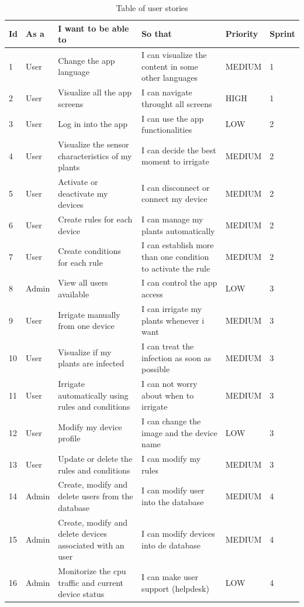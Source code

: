 \documentclass[11pt,a4paper]{article}
\begin{document}
\begin{table}[htbp]
\centering
\begin{adjustbox}{angle=90,width=2.9in}
\begin{tabular}{|l|l|l|l|l|l|}
\hline
\textbf{Id} & \textbf{As a} & \textbf{I want to be able to} & \textbf{So that} & \textbf{Priority} & \textbf{Sprint} \\
\hline \hline
1 & User & Change the app language & I can visualize the content in some other languages & MEDIUM & 1 \\
\hline
2 & User & Visualize all the app screens & I can navigate throught all screens & HIGH & 1 \\
\hline
3 & User & Log in into the app & I can use the app functionalities & LOW & 2 \\
\hline
4 & User & Visualize the sensor characteristics of my plants & I can decide the best moment to irrigate & MEDIUM & 2 \\
\hline
5 & User & Activate or deactivate my devices & I can disconnect or connect my device & MEDIUM & 2 \\
\hline
6 & User & Create rules for each device & I can manage my plants automatically & MEDIUM & 2 \\
\hline
7 & User & Create conditions for each rule & I can establish more than one condition to activate the rule & MEDIUM & 2 \\
\hline
8 & Admin & View all users available & I can control the app access & LOW & 3 \\
\hline
9 & User & Irrigate manually from one device & I can irrigate my plants whenever i want & MEDIUM & 3 \\
\hline
10 & User & Visualize if my plants are infected & I can treat the infection as soon as possible & MEDIUM & 3 \\
\hline
11 & User & Irrigate automatically using rules and conditions & I can not worry about when to irrigate & MEDIUM & 3 \\
\hline
12 & User & Modify my device profile & I can change the image and the device name & LOW & 3 \\
\hline
13 & User & Update or delete the rules and conditions & I can modify my rules & MEDIUM & 3 \\
\hline
14 & Admin & Create, modify and delete users from the database & I can modify user into the database & MEDIUM & 4 \\
\hline
15 & Admin & Create, modify and delete devices associated with an user & I can modify devices into de database & MEDIUM & 4 \\
\hline
16 & Admin & Monitorize the cpu traffic and current device status & I can make user support (helpdesk) & LOW & 4 \\
\hline
\end{tabular}
\end{adjustbox}
\caption{Table of user stories}
\end{table}
\end{document}
